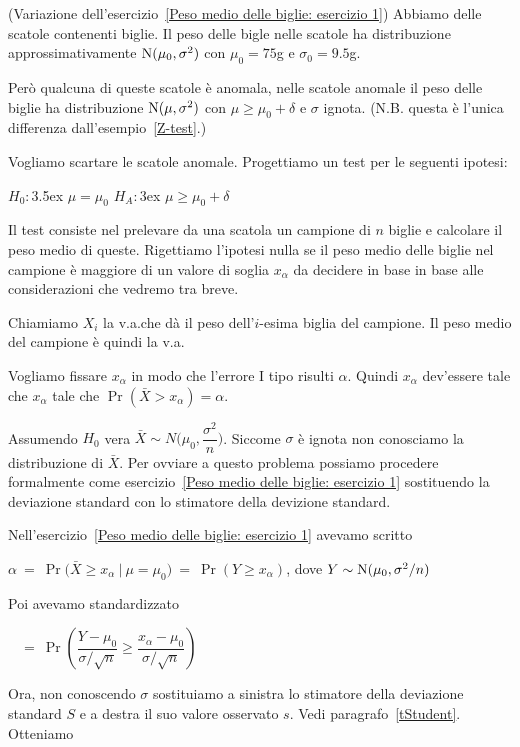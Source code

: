\documentclass[11pt,openany]{book}
\begin{document}
(Variazione dell'esercizio~\ref{Peso medio delle biglie: esercizio 1}) Abbiamo delle scatole contenenti biglie.
Il peso delle bigle nelle scatole ha distribuzione approssimativamente  ${\rm N}(\mu_0,\sigma^2)$ con $\mu_0=75$g e $\sigma_0=9.5$g. 

Però qualcuna di queste scatole è anomala, nelle scatole anomale il peso delle biglie ha distribuzione ${\rm N}(\mu,\sigma^2)$ con $\mu\ge\mu_0+\delta$ e $\sigma$ ignota. (N.B. questa è l'unica differenza dall'esempio~\ref{Z-test}.)

Vogliamo scartare le scatole anomale. 
Progettiamo un test per le seguenti ipotesi:

$H_0:$\kern3.5ex $\mu=\mu_0$
\hfil
$H_A:$\kern3ex $\mu\ge\mu_0+\delta$

Il test consiste nel prelevare da una scatola un campione di $n$ biglie e calcolare il peso medio di queste. 
Rigettiamo l'ipotesi nulla se il peso medio delle biglie nel campione è maggiore di un valore di soglia $x_\alpha$ da decidere in base in base alle considerazioni che vedremo tra breve.

Chiamiamo $X_i$ la v.a.\@ che dà il peso dell'$i$-esima biglia del campione.
Il peso medio del campione è quindi la v.a.\@



Vogliamo fissare $x_\alpha$ in modo che l'errore I tipo risulti $\alpha$. 
Quindi $x_\alpha$ dev'essere tale che $x_\alpha$ tale che $\Pr(\bar X>x_\alpha)=\alpha$.

Assumendo $H_0$ vera $\bar X\sim N\bigg(\mu_0,\dfrac{\sigma^2}{n}\bigg)$.
Siccome $\sigma$ è ignota non conosciamo la distribuzione di $\bar X$.
Per ovviare a questo problema possiamo procedere formalmente come esercizio~\ref{Peso medio delle biglie: esercizio 1} sostituendo la deviazione standard con lo stimatore della devizione standard. 

Nell'esercizio~\ref{Peso medio delle biglie: esercizio 1} avevamo scritto

$\alpha\ =\ \Pr\big(\bar X\ge x_\alpha\ \mathbin\big|\ \mu=\mu_0\big)\ =\ \Pr(Y\ge x_\alpha)$, dove $Y\sim {\rm N}(\mu_0,\sigma^2/n)$

Poi avevamo standardizzato\medskip

$\phantom{\alpha}\ =\ \Pr\left(\dfrac{Y-\mu_0}{\sigma/\sqrt{n}}\ge \dfrac{x_\alpha-\mu_0}{\sigma/\sqrt{n}}\right)$\medskip

Ora, non conoscendo $\sigma$ sostituiamo a sinistra lo stimatore della deviazione standard $S$ e a destra il suo valore osservato $s$.
Vedi paragrafo~\ref{tStudent}.
Otteniamo\medskip
\end{document}

